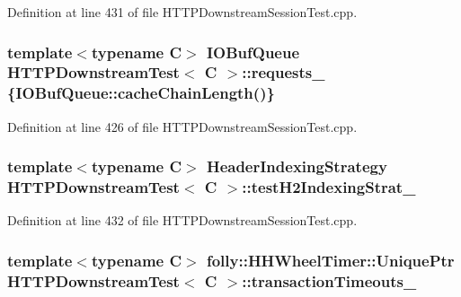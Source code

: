 Definition at line 431 of file H\+T\+T\+P\+Downstream\+Session\+Test.\+cpp.

\subsubsection[{requests\+\_\+}]{\setlength{\rightskip}{0pt plus 5cm}template$<$typename C$>$ I\+O\+Buf\+Queue {\bf H\+T\+T\+P\+Downstream\+Test}$<$ C $>$\+::requests\+\_\+ \{I\+O\+Buf\+Queue\+::cache\+Chain\+Length()\}\hspace{0.3cm}{\ttfamily [protected]}}\label{classHTTPDownstreamTest_a03190a599b98f1d6691dca31fb303d28}


Definition at line 426 of file H\+T\+T\+P\+Downstream\+Session\+Test.\+cpp.

\subsubsection[{test\+H2\+Indexing\+Strat\+\_\+}]{\setlength{\rightskip}{0pt plus 5cm}template$<$typename C$>$ {\bf Header\+Indexing\+Strategy} {\bf H\+T\+T\+P\+Downstream\+Test}$<$ C $>$\+::test\+H2\+Indexing\+Strat\+\_\+\hspace{0.3cm}{\ttfamily [protected]}}\label{classHTTPDownstreamTest_a0a392c199fd91632e7fee519fca15423}


Definition at line 432 of file H\+T\+T\+P\+Downstream\+Session\+Test.\+cpp.

\subsubsection[{transaction\+Timeouts\+\_\+}]{\setlength{\rightskip}{0pt plus 5cm}template$<$typename C$>$ folly\+::\+H\+H\+Wheel\+Timer\+::\+Unique\+Ptr {\bf H\+T\+T\+P\+Downstream\+Test}$<$ C $>$\+::transaction\+Timeouts\+\_\+\hspace{0.3cm}{\ttfamily [protected]}}\label{classHTTPDownstreamTest_a795ecf7e745d3067b28adc343f904360}


